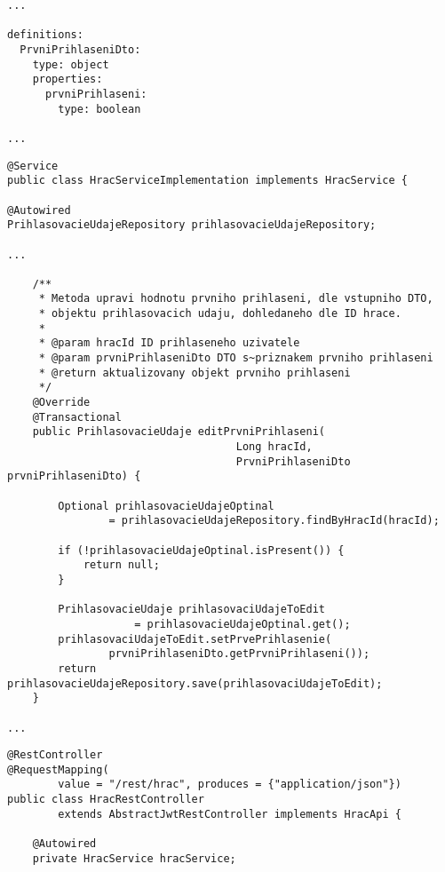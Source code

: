 \documentclass[twoside, 12pt]{article}
\begin{document}
{{\begin{lstlisting}
...

definitions:
  PrvniPrihlaseniDto:
    type: object
    properties:
      prvniPrihlaseni:
        type: boolean

...

\end{lstlisting}

\clearpage


\begin{lstlisting}
@Service
public class HracServiceImplementation implements HracService {

@Autowired
PrihlasovacieUdajeRepository prihlasovacieUdajeRepository;

...

    /**
     * Metoda upravi hodnotu prvniho prihlaseni, dle vstupniho DTO,
     * objektu prihlasovacich udaju, dohledaneho dle ID hrace.
     *
     * @param hracId ID prihlaseneho uzivatele
     * @param prvniPrihlaseniDto DTO s~priznakem prvniho prihlaseni
     * @return aktualizovany objekt prvniho prihlaseni
     */
    @Override
    @Transactional
    public PrihlasovacieUdaje editPrvniPrihlaseni(
                                    Long hracId,
                                    PrvniPrihlaseniDto prvniPrihlaseniDto) {

        Optional prihlasovacieUdajeOptinal
                = prihlasovacieUdajeRepository.findByHracId(hracId);

        if (!prihlasovacieUdajeOptinal.isPresent()) {
            return null;
        }

        PrihlasovacieUdaje prihlasovaciUdajeToEdit
                    = prihlasovacieUdajeOptinal.get();
        prihlasovaciUdajeToEdit.setPrvePrihlasenie(
                prvniPrihlaseniDto.getPrvniPrihlaseni());
        return prihlasovacieUdajeRepository.save(prihlasovaciUdajeToEdit);
    }

...
\end{lstlisting}

\clearpage


\begin{lstlisting}
@RestController
@RequestMapping(
        value = "/rest/hrac", produces = {"application/json"})
public class HracRestController
        extends AbstractJwtRestController implements HracApi {

    @Autowired
    private HracService hracService;


\end{lstlisting}}}
\end{document}
